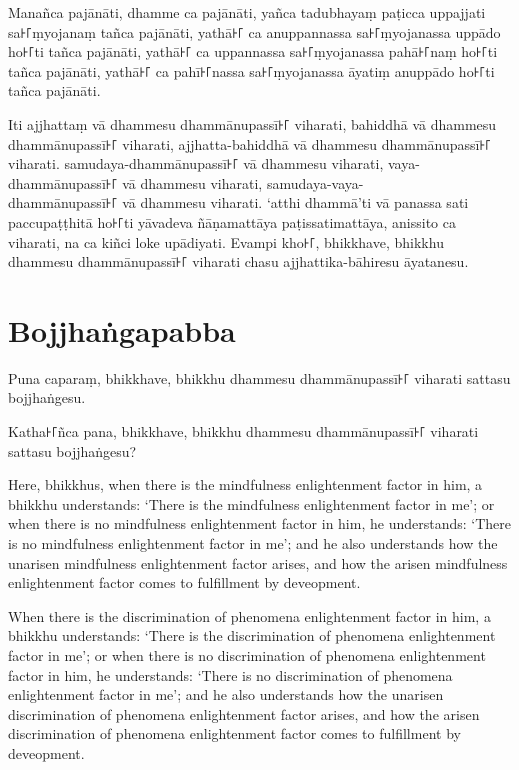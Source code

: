 Manañca pajānāti,
dhamme ca pajānāti,
yañca tadubhayaṃ paṭicca uppajjati sa꜔꜒ṃyojanaṃ tañca pajānāti,
yathā꜔꜒ ca anuppannassa sa꜔꜒ṃyojanassa uppādo ho꜔꜒ti tañca pajānāti,
yathā꜔꜒ ca uppannassa sa꜔꜒ṃyojanassa pahā꜔꜒naṃ ho꜔꜒ti tañca pajānāti,
yathā꜔꜒ ca pahī꜔꜒nassa sa꜔꜒ṃyojanassa āyatiṃ anuppādo ho꜔꜒ti tañca pajānāti.

Iti ajjhattaṃ vā dhammesu dhammānupassī꜔꜒ viharati,
bahiddhā vā dhammesu dhammānupassī꜔꜒ viharati,
ajjhatta-bahiddhā vā dhammesu dhammānupassī꜔꜒ viharati.
samudaya-dhammānupassī꜔꜒ vā dhammesu viharati,
vaya-dhammānupassī꜔꜒ vā dhammesu viharati,
samudaya-vaya-\\ dhammānupassī꜔꜒ vā dhammesu viharati.
‘atthi dhammā’ti vā panassa sati paccupaṭṭhitā ho꜔꜒ti
yāvadeva ñāṇamattāya paṭissatimattāya, anissito ca viharati,
na ca kiñci loke upādiyati. Evampi kho꜔꜒, bhikkhave, bhikkhu
dhammesu dhammānupassī꜔꜒ viharati chasu ajjhattika-bāhiresu āyatanesu.


\section*{Bojjhaṅgapabba}

Puna caparaṃ, bhikkhave, bhikkhu dhammesu dhammānupassī꜔꜒ viharati sattasu
bojjhaṅgesu.

Katha꜔꜒ñca pana, bhikkhave, bhikkhu dhammesu dhammānupassī꜔꜒ viharati sattasu
bojjhaṅgesu?

\englishPage

Here, bhikkhus, when there is the mindfulness enlightenment factor in him, a
bhikkhu understands: `There is the mindfulness enlightenment factor in me'; or
when there is no mindfulness enlightenment factor in him, he understands: `There
is no mindfulness enlightenment factor in me'; and he also understands how the
unarisen mindfulness enlightenment factor arises, and how the arisen mindfulness
enlightenment factor comes to fulfillment by deveopment.

When there is the discrimination of phenomena enlightenment factor in him, a
bhikkhu understands: `There is the discrimination of phenomena enlightenment
factor in me'; or when there is no discrimination of phenomena enlightenment
factor in him, he understands: `There is no discrimination of phenomena
enlightenment factor in me'; and he also understands how the unarisen
discrimination of phenomena enlightenment factor arises, and how the arisen
discrimination of phenomena enlightenment factor comes to fulfillment by
deveopment.

